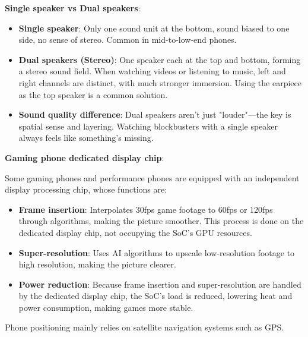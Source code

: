 \textbf{Single speaker vs Dual speakers}:

\begin{itemize}
  \item \textbf{Single speaker}: Only one sound unit at the bottom, sound biased to one side, no sense of stereo. Common in mid-to-low-end phones.
  \item \textbf{Dual speakers (Stereo)}: One speaker each at the top and bottom, forming a stereo sound field. When watching videos or listening to music, left and right channels are distinct, with much stronger immersion. Using the earpiece as the top speaker is a common solution.
  \item \textbf{Sound quality difference}: Dual speakers aren't just "louder"—the key is spatial sense and layering. Watching blockbusters with a single speaker always feels like something's missing.
\end{itemize}

\textbf{Gaming phone dedicated display chip}:

Some gaming phones and performance phones are equipped with an independent display processing chip, whose functions are:

\begin{itemize}
  \item \textbf{Frame insertion}: Interpolates 30fps game footage to 60fps or 120fps through algorithms, making the picture smoother. This process is done on the dedicated display chip, not occupying the SoC's GPU resources.
  \item \textbf{Super-resolution}: Uses AI algorithms to upscale low-resolution footage to high resolution, making the picture clearer.
  \item \textbf{Power reduction}: Because frame insertion and super-resolution are handled by the dedicated display chip, the SoC's load is reduced, lowering heat and power consumption, making games more stable.
\end{itemize}


Phone positioning mainly relies on satellite navigation systems such as GPS.

